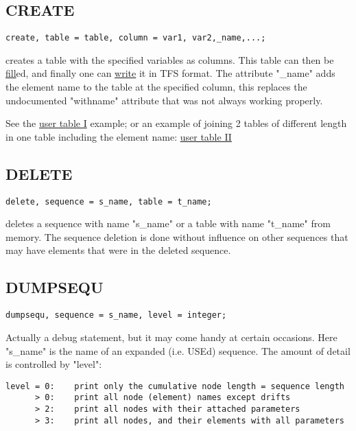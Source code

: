 \subsection{CREATE}
\begin{verbatim}
create, table = table, column = var1, var2,_name,...;
\end{verbatim} 
creates a table with the specified variables as columns. This table can
then be \hyperlink{fill}{fill}ed, and finally one can
\hyperlink{write}{write} it in TFS format. The attribute "\_name" adds
the element name to the table at the specified column, this replaces the
undocumented "withname" attribute that was not always working properly.  

See the \href{../Introduction/select.html#ucreate}{user table I}
example; 
or an example of joining 2 tables of different length in one table
including the element name:
\href{../Introduction/select.html#screate}{user table II} 

\subsection{DELETE}
\begin{verbatim}
delete, sequence = s_name, table = t_name;
\end{verbatim} 
deletes a sequence with name "s\_name" or a table with name "t\_name"
from memory. The sequence deletion is done without influence on other
sequences that may have elements that were in the deleted sequence.  

\subsection{DUMPSEQU}
\begin{verbatim}
dumpsequ, sequence = s_name, level = integer;
\end{verbatim} 
Actually a debug statement, but it may come handy at certain
occasions. Here "s\_name" is the name of an expanded (i.e. USEd)
sequence. The amount of detail is controlled by "level":  
\begin{verbatim}
level = 0:    print only the cumulative node length = sequence length
      > 0:    print all node (element) names except drifts
      > 2:    print all nodes with their attached parameters
      > 3:    print all nodes, and their elements with all parameters
\end{verbatim}


